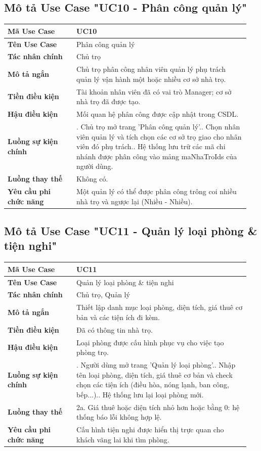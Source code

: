 \subsection{Mô tả Use Case "UC10 - Phân công quản lý"}

\begin{longtable}[]{@{}>{\RaggedRight\arraybackslash}p{0.27\linewidth}>{\RaggedRight\arraybackslash}p{0.68\linewidth}@{}}
\toprule
\textbf{Mã Use Case} & UC10\tabularnewline
\midrule
\endhead
\textbf{Tên Use Case} & Phân công quản lý\tabularnewline
\textbf{Tác nhân chính} & Chủ trọ\tabularnewline
\textbf{Mô tả ngắn} & Chủ trọ phân công nhân viên quản lý phụ trách quản
lý vận hành một hoặc nhiều cơ sở nhà trọ.\tabularnewline
\textbf{Tiền điều kiện} & Tài khoản nhân viên đã có vai trò Manager; cơ
sở nhà trọ đã được tạo.\tabularnewline
\textbf{Hậu điều kiện} & Mối quan hệ phân công được cập nhật trong
CSDL.\tabularnewline
\textbf{Luồng sự kiện chính} & 1. Chủ trọ mở trang
'Phân công quản lý'.\newline 2. Chọn nhân viên quản lý và tích chọn
các cơ sở trọ giao cho nhân viên đó phụ trách.\newline 3. Hệ thống
lưu trữ các mã chi nhánh được phân công vào mảng maNhaTroIds của người
dùng.\tabularnewline
\textbf{Luồng thay thế} & Không có.\tabularnewline
\textbf{Yêu cầu phi chức năng} & Một quản lý có thể được phân công trông
coi nhiều nhà trọ và ngược lại (Nhiều - Nhiều).\tabularnewline
\bottomrule
\end{longtable}

\subsection{Mô tả Use Case "UC11 - Quản lý loại phòng \& tiện nghi"}

\begin{longtable}[]{@{}>{\RaggedRight\arraybackslash}p{0.27\linewidth}>{\RaggedRight\arraybackslash}p{0.68\linewidth}@{}}
\toprule
\textbf{Mã Use Case} & UC11\tabularnewline
\midrule
\endhead
\textbf{Tên Use Case} & Quản lý loại phòng \& tiện nghi\tabularnewline
\textbf{Tác nhân chính} & Chủ trọ, Quản lý\tabularnewline
\textbf{Mô tả ngắn} & Thiết lập danh mục loại phòng, diện tích, giá thuê
cơ bản và các tiện ích đi kèm.\tabularnewline
\textbf{Tiền điều kiện} & Đã có thông tin nhà trọ.\tabularnewline
\textbf{Hậu điều kiện} & Loại phòng được cấu hình phục vụ cho việc tạo
phòng trọ.\tabularnewline
\textbf{Luồng sự kiện chính} & 1. Người dùng mở trang
'Quản lý loại phòng'.\newline 2. Nhập tên loại phòng, diện tích,
giá thuê cơ bản và check chọn các tiện ích (điều hòa, nóng lạnh, ban
công, bếp...).\newline 3. Hệ thống lưu lại loại phòng
mới.\tabularnewline
\textbf{Luồng thay thế} & 2a. Giá thuê hoặc diện tích nhỏ hơn hoặc bằng
0: hệ thống báo lỗi không hợp lệ.\tabularnewline
\textbf{Yêu cầu phi chức năng} & Cấu hình tiện nghi được hiển thị trực
quan cho khách vãng lai khi tìm phòng.\tabularnewline
\bottomrule
\end{longtable}

